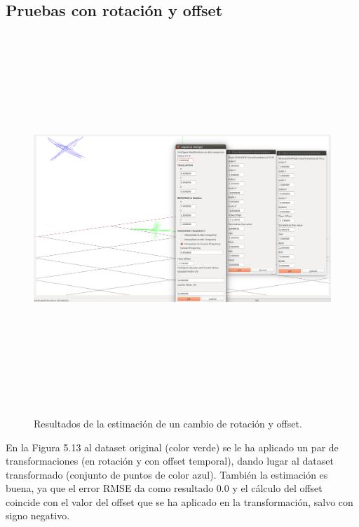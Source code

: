 \subsection{Pruebas con rotación y offset}
\begin{figure}[H]
\begin{center}
\label{fig:opciones de View}\includegraphics[height=14.0cm,width=18.0cm]{img/cap6/Rota_Offset_abba.png}
\hspace{0.5cm}

\end{center}

\caption{Resultados de la estimación de un cambio de rotación y offset.}
\end{figure}

En la Figura 5.13 al dataset original (color verde) se le ha aplicado un par de transformaciones (en rotación y con offset temporal), dando lugar al dataset transformado (conjunto de puntos de color azul). También la estimación es buena, ya que el error RMSE da como resultado 0.0 y el cálculo del offset coincide con el valor del offset que se ha aplicado en la transformación, salvo con signo negativo.


